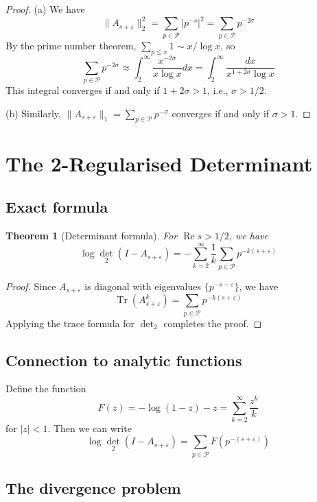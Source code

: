 \documentclass[11pt,a4paper]{article}
\newtheorem{theorem}{Theorem}[section]
\theoremstyle{definition}
\theoremstyle{remark}
\newcommand{\calP}{\mathcal{P}}
\DeclareMathOperator{\Tr}{Tr}
\DeclareMathOperator{\det}{det}
\DeclareMathOperator{\Re}{Re}
\begin{document}
\begin{proof}
(a) We have
\[
\|A_{s+\varepsilon}\|_2^2 = \sum_{p \in \calP} |p^{-s}|^2 = \sum_{p \in \calP} p^{-2\sigma}
\]
By the prime number theorem, $\sum_{p \leq x} 1 \sim x/\log x$, so
\[
\sum_{p \in \calP} p^{-2\sigma} \approx \int_2^\infty \frac{x^{-2\sigma}}{x \log x} dx = \int_2^\infty \frac{dx}{x^{1+2\sigma} \log x}
\]
This integral converges if and only if $1 + 2\sigma > 1$, i.e., $\sigma > 1/2$.

(b) Similarly, $\|A_{s+\varepsilon}\|_1 = \sum_{p \in \calP} p^{-\sigma}$ converges if and only if $\sigma > 1$.
\end{proof}

\section{The 2-Regularised Determinant}\label{sec:determinant}

\subsection{Exact formula}

\begin{theorem}[Determinant formula]\label{thm:det-formula}
For $\Re s > 1/2$, we have
\[
\log \det_2(I - A_{s+\varepsilon}) = -\sum_{k=2}^\infty \frac{1}{k} \sum_{p \in \calP} p^{-k(s+\varepsilon)}
\]
\end{theorem}

\begin{proof}
Since $A_{s+\varepsilon}$ is diagonal with eigenvalues $\{p^{-s-\varepsilon}\}$, we have
\[
\Tr(A_{s+\varepsilon}^k) = \sum_{p \in \calP} p^{-k(s+\varepsilon)}
\]
Applying the trace formula for $\det_2$ completes the proof.
\end{proof}

\subsection{Connection to analytic functions}

Define the function
\[
F(z) = -\log(1-z) - z = \sum_{k=2}^\infty \frac{z^k}{k}
\]
for $|z| < 1$. Then we can write
\[
\log \det_2(I - A_{s+\varepsilon}) = \sum_{p \in \calP} F(p^{-(s+\varepsilon)})
\]

\subsection{The divergence problem}
\end{document}
